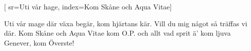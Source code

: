 [ 							
	sr={Uti vår hage},
	index={Kom Skåne och Aqua Vitae}]		
	
\beginverse*						
Uti vår mage där växa begär,
kom hjärtans kär.
Vill du mig något så träffas vi där. 
Kom Skåne och Aqua Vitae
kom O.P. och allt vad sprit ä'
kom ljuva Genever, kom Överste! 
\endverse										
\endsong		
